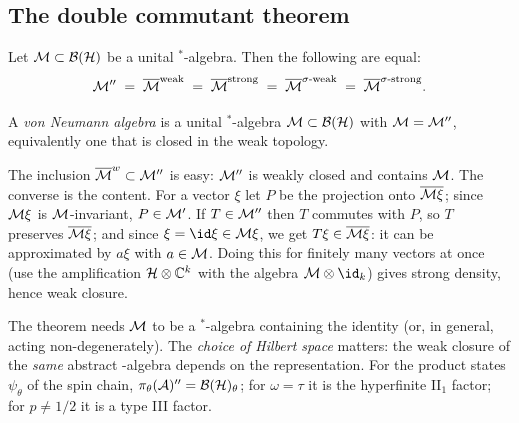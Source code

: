 \subsection{The double commutant theorem}

\begin{theorem}\label{thm:bicomm}
Let $\mathcal{M}\subset\mathcal{B}(\mathcal{H})$ be a unital $^*$-algebra. Then the following are equal:
\[
\mathcal{M}''\;=\;\overline{\mathcal{M}}^{\rm weak}\;=\;\overline{\mathcal{M}}^{\rm strong}\;=\;\overline{\mathcal{M}}^{\sigma\text{-weak}}\;=\;\overline{\mathcal{M}}^{\sigma\text{-strong}}.
\]
\end{theorem}

\begin{definition}
A \emph{von Neumann algebra} is a unital $^*$-algebra $\mathcal{M}\subset\mathcal{B}(\mathcal{H})$ with $\mathcal{M}=\mathcal{M}''$, equivalently one that is closed in the weak topology.
\end{definition}

\begin{proofsketch}
The inclusion $\overline{\mathcal{M}}^{w}\subset\mathcal{M}''$ is easy: $\mathcal{M}''$ is weakly closed and contains $\mathcal{M}$. The converse is the content. For a vector $\xi$ let $P$ be the projection onto $\overline{\mathcal{M}\xi}$; since $\mathcal{M}\xi$ is $\mathcal{M}$-invariant, $P\in\mathcal{M}'$. If $T\in\mathcal{M}''$ then $T$ commutes with $P$, so $T$ preserves $\overline{\mathcal{M}\xi}$; and since $\xi=\id\xi\in\M\xi$, we get $T\xi\in\overline{\mathcal{M}\xi}$: it can be approximated by $a\xi$ with $a\in\mathcal{M}$. Doing this for finitely many vectors at once (use the amplification $\mathcal{H}\otimes\mathbb{C}^k$ with the algebra $\M\otimes\id_k$) gives strong density, hence weak closure.
\end{proofsketch}

\begin{whatwrong}
The theorem needs $\mathcal{M}$ to be a $^*$-algebra containing the identity (or, in general, acting non-degenerately). The \emph{choice of Hilbert space} matters: the weak closure of the \emph{same} abstract \cstar-algebra depends on the representation. For the product states $\psi_\theta$ of the spin chain, $\pi_\theta(\mathcal{A})''=\mathcal{B}(\mathcal{H})_\theta$; for $\omega=\tau$ it is the hyperfinite II$_1$ factor; for $p\ne1/2$ it is a type III factor.
\end{whatwrong}

